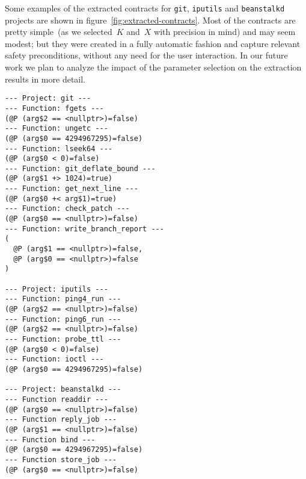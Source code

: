 Some examples of the extracted contracts for \texttt{git}, \texttt{iputils} and \texttt{beanstalkd} projects are shown in figure~\ref{fig:extracted-contracts}. Most of the contracts are pretty simple~(as we selected~$K$ and~$X$ with precision in mind) and may seem modest; but they were created in a fully automatic fashion and capture relevant safety preconditions, without any need for the user interaction. In our future work we plan to analyze the impact of the parameter selection on the extraction results in more detail.

\begin{figure*}[tbh]

\caption{Examples of the extracted contracts}
\label{fig:extracted-contracts}

\begin{lstlisting}[style=PS,multicols=2]
--- Project: git ---
--- Function: fgets ---
(@P (arg$2 == <nullptr>)=false)
--- Function: ungetc ---
(@P (arg$0 == 4294967295)=false)
--- Function: lseek64 ---
(@P (arg$0 < 0)=false)
--- Function: git_deflate_bound ---
(@P (arg$1 +> 1024)=true)
--- Function: get_next_line ---
(@P (arg$0 +< arg$1)=true)
--- Function: check_patch ---
(@P (arg$0 == <nullptr>)=false)
--- Function: write_branch_report ---
(
  @P (arg$1 == <nullptr>)=false,
  @P (arg$0 == <nullptr>)=false
)

--- Project: iputils ---
--- Function: ping4_run ---
(@P (arg$2 == <nullptr>)=false)
--- Function: ping6_run ---
(@P (arg$2 == <nullptr>)=false)
--- Function: probe_ttl ---
(@P (arg$0 < 0)=false)
--- Function: ioctl ---
(@P (arg$0 == 4294967295)=false)

--- Project: beanstalkd ---
--- Function readdir ---
(@P (arg$0 == <nullptr>)=false)
--- Function reply_job ---
(@P (arg$1 == <nullptr>)=false)
--- Function bind ---
(@P (arg$0 == 4294967295)=false)
--- Function store_job ---
(@P (arg$0 == <nullptr>)=false)

\end{lstlisting}
\end{figure*}
